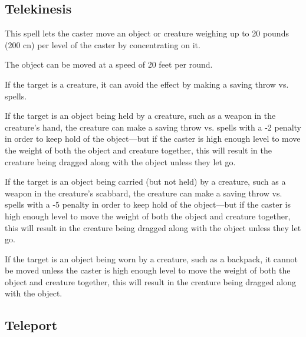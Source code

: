 \begin{multicols*}{2}
\subsection{Telekinesis}\label{spell:Telekinesis}

This spell lets the caster move an object or creature weighing up to 20 pounds (200 cn) per level of the caster by concentrating on it.

The object can be moved at a speed of 20 feet per round.

If the target is a creature, it can avoid the effect by making a saving throw vs. spells.

If the target is an object being held by a creature, such as a weapon in the creature’s hand, the creature can make a saving throw vs. spells with a -2 penalty in order to keep hold of the object—but if the caster is high enough level to move the weight of both the object and creature together, this will result in the creature being dragged along with the object unless they let go.

If the target is an object being carried (but not held) by a creature, such as a weapon in the creature’s scabbard, the creature can make a saving throw vs. spells with a -5 penalty in order to keep hold of the object—but if the caster is high enough level to move the weight of both the object and creature together, this will result in the creature being dragged along with the object unless they let go.

If the target is an object being worn by a creature, such as a backpack, it cannot be moved unless the caster is high enough level to move the weight of both the object and creature together, this will result in the creature being dragged along with the object.

\subsection{Teleport}\label{spell:Teleport}


\end{multicols*}
